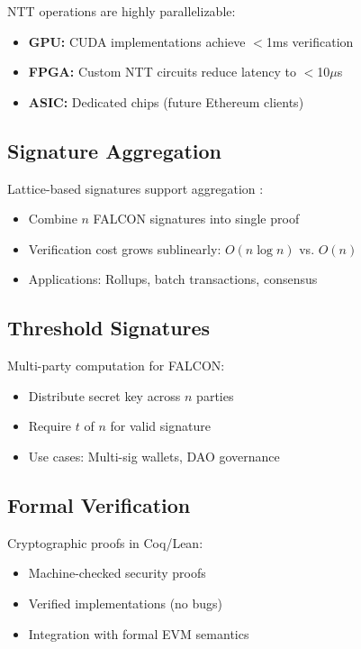 \documentclass[11pt,a4paper]{article}
\begin{document}
NTT operations are highly parallelizable:
\begin{itemize}
    \item \textbf{GPU:} CUDA implementations achieve $<$1ms verification
    \item \textbf{FPGA:} Custom NTT circuits reduce latency to $<$10$\mu$s
    \item \textbf{ASIC:} Dedicated chips (future Ethereum clients)
\end{itemize}

\subsection{Signature Aggregation}

Lattice-based signatures support aggregation \cite{boneh2018compact}:
\begin{itemize}
    \item Combine $n$ FALCON signatures into single proof
    \item Verification cost grows sublinearly: $O(n \log n)$ vs. $O(n)$
    \item Applications: Rollups, batch transactions, consensus
\end{itemize}

\subsection{Threshold Signatures}

Multi-party computation for FALCON:
\begin{itemize}
    \item Distribute secret key across $n$ parties
    \item Require $t$ of $n$ for valid signature
    \item Use cases: Multi-sig wallets, DAO governance
\end{itemize}

\subsection{Formal Verification}

Cryptographic proofs in Coq/Lean:
\begin{itemize}
    \item Machine-checked security proofs
    \item Verified implementations (no bugs)
    \item Integration with formal EVM semantics
\end{itemize}
\end{document}
